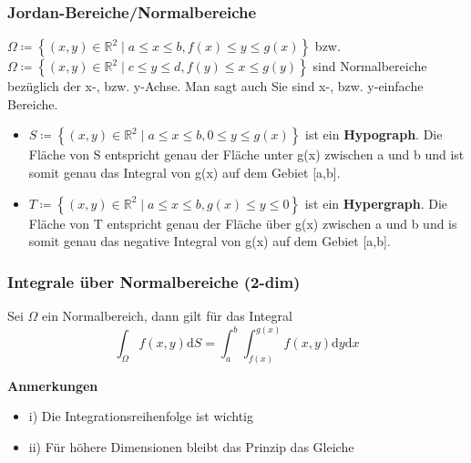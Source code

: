 \documentclass[8pt, a4paper, landscape, fleqn]{scrartcl}
\newenvironment {annotation}[1]
				{\begin{itshape} \begin{small} \textbf{#1} \begin{itemize}}
				{\end{itemize} \end{small} \end{itshape}}
\begin{document}
\begin{multicols*}{3}
			    \subsubsection{Jordan-Bereiche/Normalbereiche}
			        $\Omega \coloneqq \left\{(x, y) \in \mathbb{R}^2 \mid a \le x \le b, f(x) \le y \le g(x) \right\}$ bzw.\\
			        $\Omega \coloneqq \left\{(x, y) \in \mathbb{R}^2 \mid c \le y \le d, f(y) \le x \le g(y) \right\}$ sind Normalbereiche bezüglich der x-, bzw. y-Achse. Man sagt auch Sie sind x-, bzw. y-einfache Bereiche.
			        \begin{itemize}
			            \item $S \coloneqq \left\{(x, y) \in \mathbb{R}^2 \mid a \le x \le b, 0 \le y \le g(x) \right\}$ ist ein \textbf{Hypograph}. Die Fläche von S entspricht genau der Fläche unter g(x) zwischen a und b und ist somit genau das Integral von g(x) auf dem Gebiet [a,b].\\
			            \item $T \coloneqq \left\{(x, y) \in \mathbb{R}^2 \mid a \le x \le b, g(x) \le y \le 0 \right\}$
			            ist ein \textbf{Hypergraph}. Die Fläche von T entspricht genau der Fläche über g(x) zwischen a und b und is somit genau das negative Integral von g(x) auf dem Gebiet [a,b].
			        \end{itemize}
				\subsubsection{Integrale über Normalbereiche (2-dim)}
					Sei $\Omega$ ein Normalbereich, dann gilt für das Integral
					\begin{equation*}
						\int_{\Omega}f(x, y)\text{d}S=\int_{a}^{b}\int_{f(x)}^{g(x)}f(x, y)\text{d}y \text{d}x
					\end{equation*}
					\begin{annotation}{Anmerkungen}
						\item [i)] Die Integrationsreihenfolge ist wichtig
						\item [ii)] Für höhere Dimensionen bleibt das Prinzip das Gleiche
					\end{annotation}
					
				

\end{multicols*}
\end{document}
